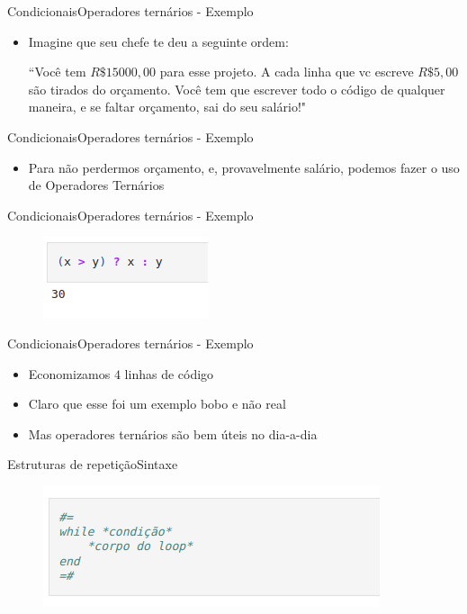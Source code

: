 \documentclass{beamer}
\begin{document}
\begin{frame}{Condicionais}{Operadores ternários - Exemplo}
    \begin{itemize}
        \item Imagine que seu chefe te deu a seguinte ordem:
        \begin{center}
            ``Você tem $R\$15000,00$ para esse projeto. A cada linha que vc escreve $R\$5,00$ são tirados do orçamento. Você tem que escrever todo o código de qualquer maneira, e se faltar orçamento, sai do seu salário!"
        \end{center}
    \end{itemize}
\end{frame}

\begin{frame}{Condicionais}{Operadores ternários - Exemplo}
    \begin{itemize}
        \item Para não perdermos orçamento, e, provavelmente salário, podemos fazer o uso de Operadores Ternários
    \end{itemize}
\end{frame}

\begin{frame}{Condicionais}{Operadores ternários - Exemplo}
    \begin{figure}
        \centering
        \includegraphics[scale=0.6]{imagens/ternario.png}
        \label{fig:my_label}
    \end{figure}  
\end{frame}

\begin{frame}{Condicionais}{Operadores ternários - Exemplo}
    \begin{itemize}
        \item Economizamos $4$ linhas de código
        \item Claro que esse foi um exemplo bobo e não real
        \item Mas operadores ternários são bem úteis no dia-a-dia
    \end{itemize}
\end{frame}

\begin{frame}{Estruturas de repetição}{Sintaxe}
    \begin{figure}
        \centering
        \includegraphics[scale=0.6]{imagens/while.png}
        \label{fig:my_label}
    \end{figure}
\end{frame}
\end{document}
